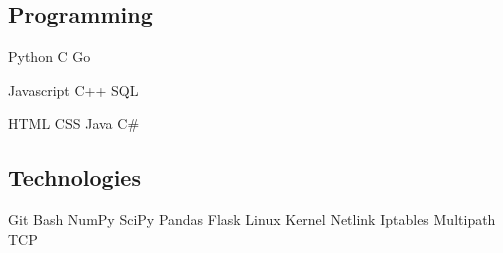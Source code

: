 \documentclass[letterpaper]{deedy-resume} %
\newcommand{\bul}{\textbullet{}}
\begin{document}
\begin{minipage}[t]{0.33\textwidth}
\subsection{Programming}


Python \bul C \bul Go


Javascript \bul C++ \bul SQL


HTML \bul CSS \bul Java \bul C\#

\sectionspace %

\subsection{Technologies}

Git \bul Bash \bul NumPy \bul SciPy \bul Pandas \bul Flask \bul Linux Kernel
\bul Netlink \bul Iptables \bul Multipath TCP


\end{minipage} %
\hfill
%
%
\end{document}
